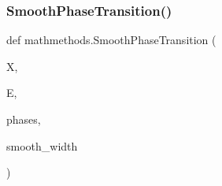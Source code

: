 \mbox{\label{namespacemathmethods_a23952fa97f7a35c59be3b94425bd3b1b}} 
\subsubsection{\texorpdfstring{Smooth\+Phase\+Transition()}{SmoothPhaseTransition()}}
{\footnotesize\ttfamily def mathmethods.\+Smooth\+Phase\+Transition (\begin{DoxyParamCaption}\item[{}]{X,  }\item[{}]{E,  }\item[{}]{phases,  }\item[{}]{smooth\+\_\+width }\end{DoxyParamCaption})}

